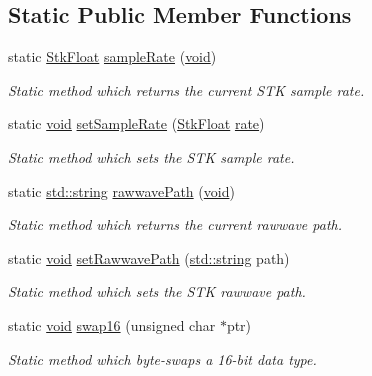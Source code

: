 \subsection*{Static Public Member Functions}
\begin{DoxyCompactItemize}
\item 
static \hyperlink{namespace_nyq_a044fa20a706520a617bbbf458a7db7e4}{Stk\+Float} \hyperlink{class_nyq_1_1_stk_a5f60154b24fa1317cf79ac0ef11c30c0}{sample\+Rate} (\hyperlink{sound_8c_ae35f5844602719cf66324f4de2a658b3}{void})
\begin{DoxyCompactList}\small\item\em Static method which returns the current S\+TK sample rate. \end{DoxyCompactList}\item 
static \hyperlink{sound_8c_ae35f5844602719cf66324f4de2a658b3}{void} \hyperlink{class_nyq_1_1_stk_a4a22b5faa4bf01ed8a667bf3d120dcc1}{set\+Sample\+Rate} (\hyperlink{namespace_nyq_a044fa20a706520a617bbbf458a7db7e4}{Stk\+Float} \hyperlink{seqread_8c_ad89d3fac2deab7a9cf6cfc8d15341b85}{rate})
\begin{DoxyCompactList}\small\item\em Static method which sets the S\+TK sample rate. \end{DoxyCompactList}\item 
static \hyperlink{test__lib_f_l_a_c_2format_8c_ab02026ad0de9fb6c1b4233deb0a00c75}{std\+::string} \hyperlink{class_nyq_1_1_stk_a97ee0bb2086a47109c27ea524bd5dbd4}{rawwave\+Path} (\hyperlink{sound_8c_ae35f5844602719cf66324f4de2a658b3}{void})
\begin{DoxyCompactList}\small\item\em Static method which returns the current rawwave path. \end{DoxyCompactList}\item 
static \hyperlink{sound_8c_ae35f5844602719cf66324f4de2a658b3}{void} \hyperlink{class_nyq_1_1_stk_aedb8a47be994bff926bd6caea4ff23ca}{set\+Rawwave\+Path} (\hyperlink{test__lib_f_l_a_c_2format_8c_ab02026ad0de9fb6c1b4233deb0a00c75}{std\+::string} path)
\begin{DoxyCompactList}\small\item\em Static method which sets the S\+TK rawwave path. \end{DoxyCompactList}\item 
static \hyperlink{sound_8c_ae35f5844602719cf66324f4de2a658b3}{void} \hyperlink{class_nyq_1_1_stk_ae4167fa5875df140c384043c856254bd}{swap16} (unsigned char $\ast$ptr)
\begin{DoxyCompactList}\small\item\em Static method which byte-\/swaps a 16-\/bit data type. \end{DoxyCompactList}\item 

\end{DoxyCompactItemize}
